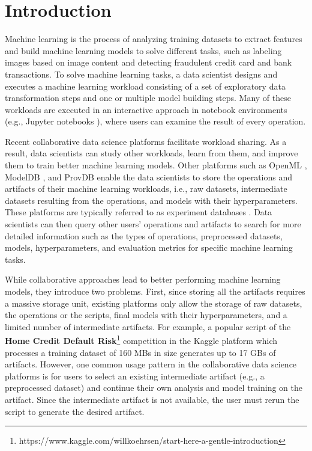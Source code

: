 \section{Introduction} \label{sec-introduction}
Machine learning is the process of analyzing training datasets to extract features and build machine learning models to solve different tasks, such as labeling images based on image content and detecting fraudulent credit card and bank transactions.
To solve machine learning tasks, a data scientist designs and executes a machine learning workload consisting of a set of exploratory data transformation steps and one or multiple model building steps.
Many of these workloads are executed in an interactive approach in notebook environments (e.g., Jupyter notebooks \cite{Kluyver:2016aa}), where users can examine the result of every operation.

Recent collaborative data science platforms facilitate workload sharing.
As a result, data scientists can study other workloads, learn from them, and improve them to train better machine learning models.
Other platforms such as OpenML \cite{vanschoren2014openml}, ModelDB \cite{vartak2016m}, and ProvDB \cite{miao2018provdb} enable the data scientists to store the operations and artifacts of their machine learning workloads, i.e., raw datasets, intermediate datasets resulting from the operations, and models with their hyperparameters.
These platforms are typically referred to as experiment databases \cite{Vanschoren2012}.
Data scientists can then query other users' operations and artifacts to search for more detailed information such as the types of operations, preprocessed datasets, models, hyperparameters, and evaluation metrics for specific machine learning tasks.

While collaborative approaches lead to better performing machine learning models, they introduce two problems.
First, since storing all the artifacts requires a massive storage unit, existing platforms only allow the storage of raw datasets, the operations or the scripts, final models with their hyperparameters, and a limited number of intermediate artifacts.
For example, a popular script of the \textbf{Home Credit Default Risk}\footnote{https://www.kaggle.com/willkoehrsen/start-here-a-gentle-introduction} competition in the Kaggle platform which processes a training dataset of 160 MBs in size generates up to 17 GBs of artifacts.
However, one common usage pattern in the collaborative data science platforms is for users to select an existing intermediate artifact (e.g., a preprocessed dataset) and continue their own analysis and model training on the artifact. 
Since the intermediate artifact is not available, the user must rerun the script to generate the desired artifact.

